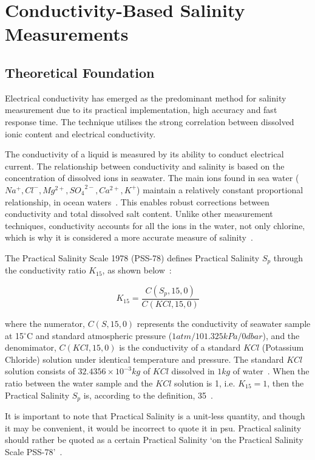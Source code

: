 \section{Conductivity-Based Salinity Measurements}
\subsection{Theoretical Foundation}\label{sec:salinity_theory}
Electrical conductivity has emerged as the predominant method for salinity measurement due to its practical implementation, high accuracy and fast response time.
The technique utilises the strong correlation between dissolved ionic content and electrical conductivity.

The conductivity of a liquid is measured by its ability to conduct electrical current.
The relationship between conductivity and salinity is based on the concentration of dissolved ions in seawater.
The main ions found in sea water ($Na^+, Cl^-, Mg^{2+}, {SO_4}^{2-}, Ca^{2+}, K^+$) maintain a relatively constant proportional relationship, in ocean waters~\cite{chemical_ocean}.
This enables robust corrections between conductivity and total dissolved salt content.
Unlike other measurement techniques, conductivity accounts for all the ions in the water, not only chlorine, which is why it is considered a more accurate measure of salinity~\cite{salinity_def_calc}.

The Practical Salinity Scale 1978 (PSS-78) defines Practical Salinity $S_p$ through the conductivity ratio $K_{15}$, as shown below~\cite{teos-10}:

\begin{equation}\label{eqn:k15_salinity}
    K_{15} = \frac{C(S_p, 15, 0)}{C(KCl, 15, 0)}
\end{equation}

where the numerator, $C(S, 15, 0)$ represents the conductivity of seawater sample at 15$^\circ$C and standard atmospheric pressure ($1 atm/101.325 kPa/0dbar$), and the denomimator, $C(KCl, 15, 0)$ is the conductivity of a standard $KCl$ (Potassium Chloride) solution under identical temperature and pressure.
The standard $KCl$ solution consists of $32.4356 \times 10^{-3}kg$ of $KCl$ dissolved in $1kg$ of water~\cite{lewis_pss78}.
When the ratio between the water sample and the $KCl$ solution is 1, i.e. $K_{15} = 1$, then the Practical Salinity $S_p$ is, according to the definition, 35~\cite{teos-10}.

It is important to note that Practical Salinity is a unit-less quantity, and though it may be convenient, it would be incorrect to quote it in \gls{psu}. 
Practical salinity should rather be quoted as a certain Practical Salinity `on the Practical Salinity Scale PSS-78'~\cite{teos-10}. 

